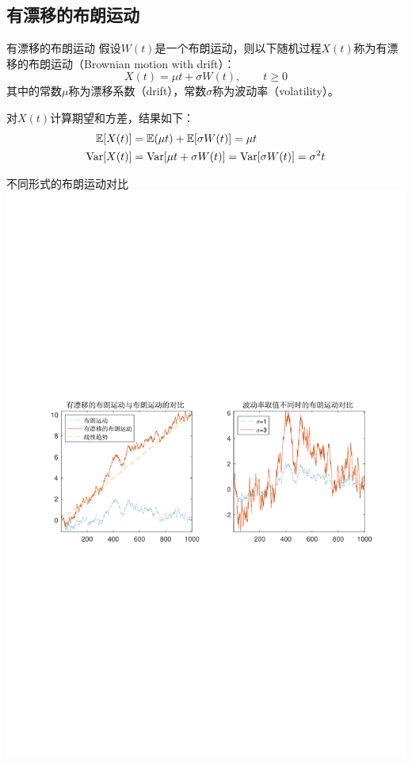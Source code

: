 \documentclass[t]{beamer}
\newcommand{\E}{\mathbb{E}}
\newcommand{\Var}{{\rm Var}}
\begin{document}
\subsection{有漂移的布朗运动}
\begin{frame}{有漂移的布朗运动}
  假设$W(t)$是一个布朗运动，则以下随机过程$X(t)$称为有漂移的布朗运动（Brownian motion with drift）：
  \begin{equation*}
  X(t)=\mu t+\sigma W(t), \qquad t\ge 0
  \end{equation*}
  其中的常数$\mu$称为漂移系数（drift），常数$\sigma$称为波动率（volatility）。

  对$X(t)$计算期望和方差，结果如下：
\begin{equation*}
\begin{split}
\E[X(t)]&=\E(\mu t)+\E[\sigma W(t)]=\mu t\\
\Var[X(t)]&=\Var[\mu t+\sigma W(t)]=\Var[\sigma W(t)]=\sigma^2 t
\end{split}
\end{equation*}
\end{frame}



\begin{frame}{不同形式的布朗运动对比}
  \centering 
	\includegraphics[height=.65\textheight]{fig/drift.pdf}
\end{frame}
\end{document}

